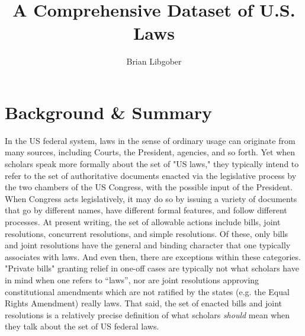 \documentclass[fleqn,10pt]{wlscirep}
\title{A Comprehensive Dataset of U.S. Laws }
\author[$\dag$]{Brian Libgober}
\affil[$\dag$]{Northwestern University, Department of Political Science and School of Law, Evanston, IL, 60202, USA. brian.libgober@northwestern.edu}
\begin{document}
\flushbottom
\maketitle

\thispagestyle{empty}

\section*{Background \& Summary}


In the US federal system, laws in the sense of ordinary usage can originate from many sources, including Courts, the President, agencies, and so forth. Yet when scholars speak more formally about the set of "US laws," they typically intend to refer to the set of authoritative documents enacted via the legislative process by the two chambers of the US Congress, with the possible input of the President. When Congress acts legislatively, it may do so by issuing a variety of documents that go by different names, have different formal features, and follow different processes. At present writing, the set of allowable actions include bills, joint resolutions, concurrent resolutions, and simple resolutions. Of these, only bills and joint resolutions have the general and binding character that one typically associates with laws. And even then, there are exceptions within these categories. "Private bills" granting relief in one-off cases are typically not what scholars have in mind when one refers to ``laws'', nor are joint resolutions approving constitutional amendments which are not ratified by the states (e.g. the Equal Rights Amendment) really laws. That said, the set of enacted bills and joint resolutions is a relatively precise definition of what scholars \textit{should} mean when they talk about the set of US federal laws.
\end{document}
